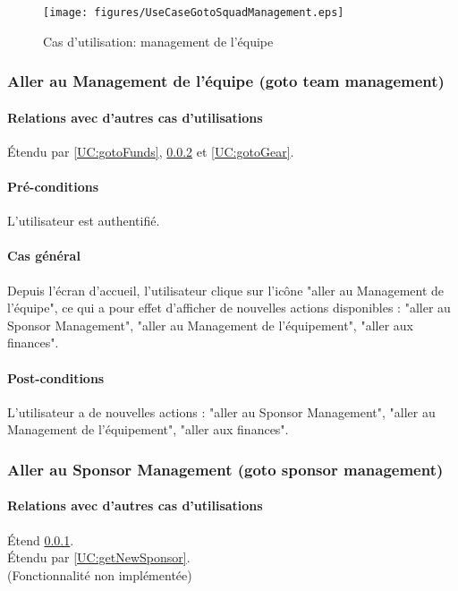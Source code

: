 \begin{list}{}{\leftmargin=1.5em}
\begin{figure}[h]
  \centering
  \texttt{[image: figures/UseCaseGotoSquadManagement.eps]}
   \caption{\label{fig:UC:gotoManagement} Cas d'utilisation: management de l'équipe}
\end{figure}

\subsubsection{Aller au Management de l'équipe (goto team management)}
\label{UC:gotoManagement}
\paragraph{Relations avec d'autres cas d'utilisations}
Étendu par \ref{UC:gotoFunds}, \ref{UC:gotoSponsor} et \ref{UC:gotoGear}.
\paragraph{Pré-conditions}
\begin{list}{}{\leftmargin=1.5em}
\item{L'utilisateur est authentifié.}
\end{list}
\paragraph{Cas général}
Depuis l'écran d'accueil, l'utilisateur clique sur l'icône "aller au Management de l'équipe", ce qui a pour effet d'afficher de nouvelles actions disponibles : "aller au Sponsor Management", "aller au Management de l'équipement", "aller aux finances".
\paragraph{Post-conditions}
\begin{list}{}{\leftmargin=1.5em}
\item{L'utilisateur a de nouvelles actions : "aller au Sponsor Management", "aller au Management de l'équipement", "aller aux finances".}
\end{list}

\subsubsection{Aller au Sponsor Management (goto sponsor management)}
\label{UC:gotoSponsor}
\paragraph{Relations avec d'autres cas d'utilisations}
Étend \ref{UC:gotoManagement}.\\
Étendu par \ref{UC:getNewSponsor}.
\\(Fonctionnalité non implémentée)

\end{list}

